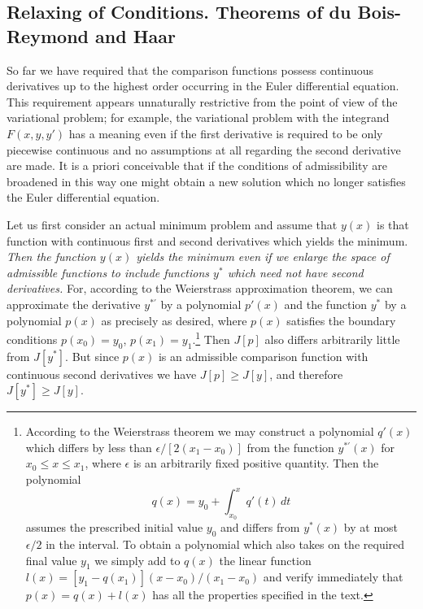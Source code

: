 \subsection{Relaxing of Conditions. Theorems of du Bois-Reymond and Haar}
So far we have required that the comparison functions possess continuous derivatives up to the highest order occurring in the Euler differential equation. This requirement appears unnaturally restrictive from the point of view of the variational problem; for example, the variational problem with the integrand $F(x,y,y')$ has a meaning even if the first derivative is required to be only piecewise continuous and no assumptions at all regarding the second derivative are made. It is a priori conceivable that if the conditions of admissibility are broadened in this way one might obtain a new solution which no longer satisfies the Euler differential equation.

Let us first consider an actual minimum problem and assume that $y(x)$ is that function with continuous first and second derivatives which yields the minimum. \emph{Then the function $y(x)$ yields the minimum even if we enlarge the space of admissible functions to include functions $y^*$ which need not have second derivatives.} For, according to the Weierstrass approximation theorem, we can approximate the derivative $y^{*\prime}$ by a polynomial $p'(x)$ and the function $y^*$ by a polynomial $p(x)$ as precisely as desired, where $p(x)$ satisfies the boundary conditions $p(x_0)=y_0$, $p(x_1)=y_1$.\footnote{According to the Weierstrass theorem we may construct a polynomial $q'(x)$ which differs by less than $\epsilon/[2(x_1-x_0)]$ from the function $y^{*\prime}(x)$ for $x_0\le x\le x_1$, where $\epsilon$ is an arbitrarily fixed positive quantity. Then the polynomial
\[
q(x)=y_0+\int_{x_0}^{x}q'(t)\,dt
\]
assumes the prescribed initial value $y_0$ and differs from $y^*(x)$ by at most $\epsilon/2$ in the interval. To obtain a polynomial which also takes on the required final value $y_1$ we simply add to $q(x)$ the linear function $l(x)=[y_1-q(x_1)](x-x_0)/(x_1-x_0)$ and verify immediately that $p(x)=q(x)+l(x)$ has all the properties specified in the text.} Then $J[p]$ also differs arbitrarily little from $J[y^*]$. But since $p(x)$ is an admissible comparison function with continuous second derivatives we have $J[p]\ge J[y]$, and therefore $J[y^*]\ge J[y]$.

